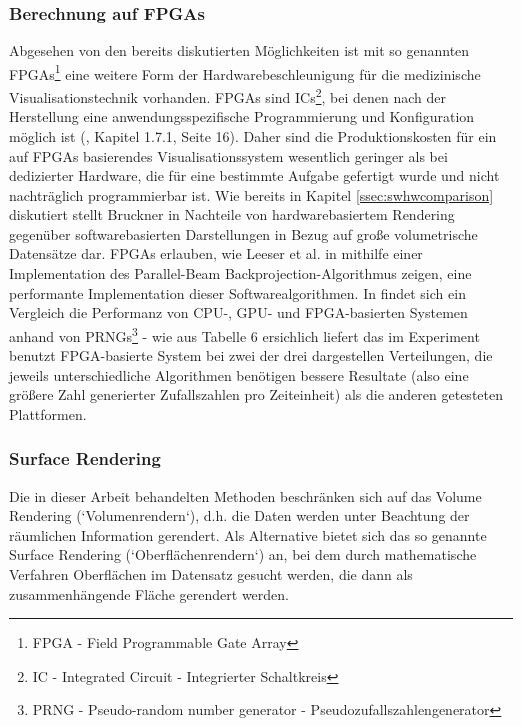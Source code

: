 \documentclass[a4paper,titlepage,12pt]{scrartcl}
\begin{document}
\subsubsection{Berechnung auf FPGAs}
Abgesehen von den bereits diskutierten Möglichkeiten ist mit so genannten FPGAs\footnote{FPGA - Field Programmable Gate Array} eine weitere Form der Hardwarebeschleunigung für die medizinische Visualisationstechnik vorhanden. FPGAs sind ICs\footnote{IC - Integrated Circuit - Integrierter Schaltkreis}, bei denen nach der Herstellung eine anwendungsspezifische Programmierung und Konfiguration möglich ist (\cite{Kibritev2009}, Kapitel 1.7.1, Seite 16). Daher sind die Produktionskosten für ein auf FPGAs basierendes Visualisationssystem wesentlich geringer als bei dedizierter Hardware, die für eine bestimmte Aufgabe gefertigt wurde und nicht nachträglich programmierbar ist. Wie bereits in Kapitel \vref{ssec:swhwcomparison} diskutiert stellt Bruckner in \cite{Bruckner2008} Nachteile von hardwarebasiertem Rendering gegenüber softwarebasierten Darstellungen in Bezug auf große volumetrische Datensätze dar. FPGAs erlauben, wie Leeser et al. in \cite{Leeser2005} mithilfe einer Implementation des Parallel-Beam Backprojection-Algorithmus zeigen, eine performante Implementation dieser Softwarealgorithmen. In \cite{Thomas2009} findet sich ein Vergleich die Performanz von CPU-, GPU- und FPGA-basierten Systemen anhand von PRNGs\footnote{PRNG - Pseudo-random number generator - Pseudozufallszahlengenerator} - wie aus Tabelle 6 ersichlich liefert das im Experiment benutzt FPGA-basierte System bei zwei der drei dargestellen Verteilungen, die jeweils unterschiedliche Algorithmen benötigen bessere Resultate (also eine größere Zahl generierter Zufallszahlen pro Zeiteinheit) als die anderen getesteten Plattformen.
\subsubsection{Surface Rendering}
Die in dieser Arbeit behandelten Methoden beschränken sich auf das Volume Rendering (`Volumenrendern`), d.h. die Daten werden unter Beachtung der räumlichen Information gerendert. Als Alternative bietet sich das so genannte Surface Rendering (`Oberflächenrendern`) an, bei dem durch mathematische Verfahren Oberflächen im Datensatz gesucht werden, die dann als zusammenhängende Fläche gerendert werden. 
\end{document}
